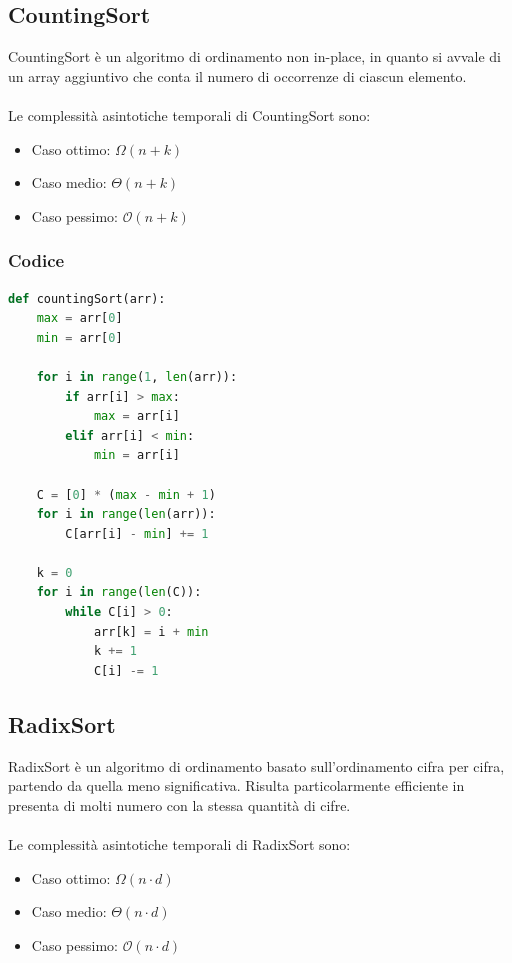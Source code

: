 \documentclass[a4paper, 11pt]{article}
\begin{document}
\subsection{CountingSort}
CountingSort è un algoritmo di ordinamento non in-place, in quanto si avvale di un array aggiuntivo che conta il numero di occorrenze di ciascun elemento.\\\\
Le complessità asintotiche temporali di CountingSort sono:
\begin{itemize}
    \item Caso ottimo: $\Omega(n + k)$
    \item Caso medio: $\Theta(n + k)$
    \item Caso pessimo: $\mathcal{O}(n + k)$
\end{itemize}

\subsubsection{Codice}
\begin{lstlisting}[style=mycodestyle, language=Python]
    def countingSort(arr):
    max = arr[0]
    min = arr[0]

    for i in range(1, len(arr)):
        if arr[i] > max:
            max = arr[i]
        elif arr[i] < min:
            min = arr[i]

    C = [0] * (max - min + 1)
    for i in range(len(arr)):
        C[arr[i] - min] += 1

    k = 0
    for i in range(len(C)):
        while C[i] > 0:
            arr[k] = i + min
            k += 1
            C[i] -= 1
\end{lstlisting}

\subsection{RadixSort}
RadixSort è un algoritmo di ordinamento basato sull'ordinamento cifra per cifra, partendo da quella meno significativa. Risulta particolarmente efficiente in presenta di molti numero con la stessa quantità di cifre.\\\\
Le complessità asintotiche temporali di RadixSort sono:
\begin{itemize}
    \item Caso ottimo: $\Omega(n\cdot d)$
    \item Caso medio: $\Theta(n\cdot d)$
    \item Caso pessimo: $\mathcal{O}(n\cdot d)$
\end{itemize}
\end{document}
